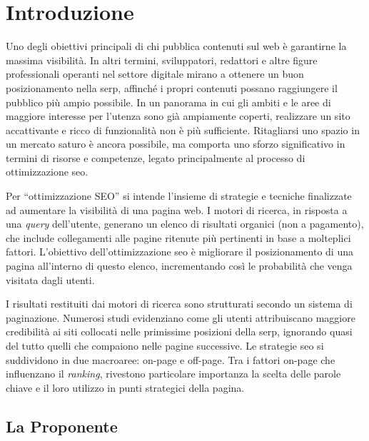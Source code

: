 \chapter{Introduzione}
\label{cap:introduzione}

\par Uno degli obiettivi principali di chi pubblica contenuti sul web è garantirne la massima visibilità. In altri termini, sviluppatori, redattori e altre figure professionali operanti nel settore digitale mirano a ottenere un buon posizionamento nella \gls{serp}, affinché i propri contenuti possano raggiungere il pubblico più ampio possibile. In un panorama in cui gli ambiti e le aree di maggiore interesse per l’utenza sono già ampiamente coperti, realizzare un sito accattivante e ricco di funzionalità non è più sufficiente. Ritagliarsi uno spazio in un mercato saturo è ancora possibile, ma comporta uno sforzo significativo in termini di risorse e competenze, legato principalmente al processo di ottimizzazione \gls{seo}.

\vspace{10pt}
\par\noindent Per “ottimizzazione SEO” si intende l’insieme di strategie e tecniche finalizzate ad aumentare la visibilità di una pagina web. I motori di ricerca, in risposta a una \textit{query} dell’utente, generano un elenco di risultati organici (non a pagamento), che include collegamenti alle pagine ritenute più pertinenti in base a molteplici fattori. L’obiettivo dell’ottimizzazione \gls{seo} è migliorare il posizionamento di una pagina all’interno di questo elenco, incrementando così le probabilità che venga visitata dagli utenti.

\vspace{10pt}
\par\noindent I risultati restituiti dai motori di ricerca sono strutturati secondo un sistema di paginazione. Numerosi studi evidenziano come gli utenti attribuiscano maggiore credibilità ai siti collocati nelle primissime posizioni della \gls{serp}, ignorando quasi del tutto quelli che compaiono nelle pagine successive. Le strategie \gls{seo} si suddividono in due macroaree: \gls{on-page} e \gls{off-page}. Tra i fattori \gls{on-page} che influenzano il \textit{ranking}, rivestono particolare importanza la scelta delle parole chiave e il loro utilizzo in punti strategici della pagina.

\section{La Proponente}


